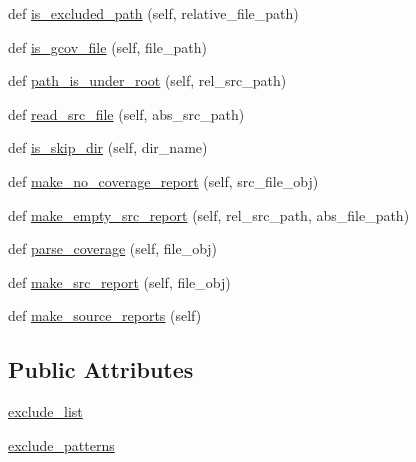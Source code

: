 \begin{DoxyCompactItemize}
def \mbox{\hyperlink{classcontext_1_1Context_a08aeb303afe0484e0a0e1ef1ba7457a1}{is\+\_\+excluded\+\_\+path}} (self, relative\+\_\+file\+\_\+path)
\item 
def \mbox{\hyperlink{classcontext_1_1Context_a383e67fc781e169024cc537569e6a62e}{is\+\_\+gcov\+\_\+file}} (self, file\+\_\+path)
\item 
def \mbox{\hyperlink{classcontext_1_1Context_ada20cba81612bcb8611ad86f27b98162}{path\+\_\+is\+\_\+under\+\_\+root}} (self, rel\+\_\+src\+\_\+path)
\item 
def \mbox{\hyperlink{classcontext_1_1Context_a5a7e27ee1c211c5bb2c729ee0eddc540}{read\+\_\+src\+\_\+file}} (self, abs\+\_\+src\+\_\+path)
\item 
def \mbox{\hyperlink{classcontext_1_1Context_a569705422cec018ffd2d7ca3fe36a659}{is\+\_\+skip\+\_\+dir}} (self, dir\+\_\+name)
\item 
def \mbox{\hyperlink{classcontext_1_1Context_aaa0e998dbd6eb019874b581fec3c2434}{make\+\_\+no\+\_\+coverage\+\_\+report}} (self, src\+\_\+file\+\_\+obj)
\item 
def \mbox{\hyperlink{classcontext_1_1Context_a375cf453c7faf1efab1b6f163cf03fa3}{make\+\_\+empty\+\_\+src\+\_\+report}} (self, rel\+\_\+src\+\_\+path, abs\+\_\+file\+\_\+path)
\item 
def \mbox{\hyperlink{classcontext_1_1Context_ab5c784e7d5e141901a98f4a7bb5019ea}{parse\+\_\+coverage}} (self, file\+\_\+obj)
\item 
def \mbox{\hyperlink{classcontext_1_1Context_a32795fc7d07990cdffa58b8c5d41177b}{make\+\_\+src\+\_\+report}} (self, file\+\_\+obj)
\item 
def \mbox{\hyperlink{classcontext_1_1Context_abc2b8d7c7e6e5ec17b0244d82bebde8c}{make\+\_\+source\+\_\+reports}} (self)
\end{DoxyCompactItemize}
\subsection*{Public Attributes}
\begin{DoxyCompactItemize}
\item 
\mbox{\hyperlink{classcontext_1_1Context_aa8c0c16bdc08826af0563c4bec02aea6}{exclude\+\_\+list}}
\item 
\mbox{\hyperlink{classcontext_1_1Context_a950f452ece49008945bc068227db5626}{exclude\+\_\+patterns}}
\end{DoxyCompactItemize}
